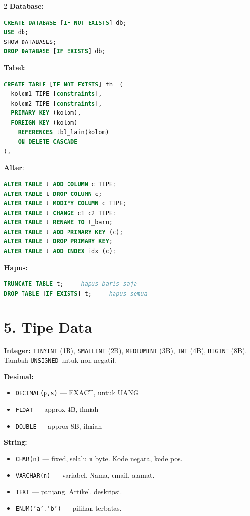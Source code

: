 \documentclass[10pt,a4paper]{article}
\begin{document}
\begin{multicols*}{2}
	\textbf{Database:}
	\begin{lstlisting}[language=SQL]
CREATE DATABASE [IF NOT EXISTS] db;
USE db;
SHOW DATABASES;
DROP DATABASE [IF EXISTS] db;
\end{lstlisting}

	\textbf{Tabel:}
	\begin{lstlisting}[language=SQL]
CREATE TABLE [IF NOT EXISTS] tbl (
  kolom1 TIPE [constraints],
  kolom2 TIPE [constraints],
  PRIMARY KEY (kolom),
  FOREIGN KEY (kolom)
    REFERENCES tbl_lain(kolom)
    ON DELETE CASCADE
);
\end{lstlisting}

	\textbf{Alter:}
	\begin{lstlisting}[language=SQL]
ALTER TABLE t ADD COLUMN c TIPE;
ALTER TABLE t DROP COLUMN c;
ALTER TABLE t MODIFY COLUMN c TIPE;
ALTER TABLE t CHANGE c1 c2 TIPE;
ALTER TABLE t RENAME TO t_baru;
ALTER TABLE t ADD PRIMARY KEY (c);
ALTER TABLE t DROP PRIMARY KEY;
ALTER TABLE t ADD INDEX idx (c);
\end{lstlisting}

	\textbf{Hapus:}
	\begin{lstlisting}[language=SQL]
TRUNCATE TABLE t;  -- hapus baris saja
DROP TABLE [IF EXISTS] t;  -- hapus semua
\end{lstlisting}

	\section*{5. Tipe Data}

	\textbf{Integer:} \texttt{TINYINT} (1B), \texttt{SMALLINT} (2B), \texttt{MEDIUMINT} (3B), \texttt{INT} (4B), \texttt{BIGINT} (8B). Tambah \texttt{UNSIGNED} untuk non-negatif.

	\textbf{Desimal:}
	\begin{itemize}
		\item \texttt{DECIMAL(p,s)} — EXACT, untuk UANG
		\item \texttt{FLOAT} — approx 4B, ilmiah
		\item \texttt{DOUBLE} — approx 8B, ilmiah
	\end{itemize}

	\textbf{String:}
	\begin{itemize}
		\item \texttt{CHAR(n)} — fixed, selalu n byte. Kode negara, kode pos.
		\item \texttt{VARCHAR(n)} — variabel. Nama, email, alamat.
		\item \texttt{TEXT} — panjang. Artikel, deskripsi.
		\item \texttt{ENUM('a','b')} — pilihan terbatas.
	\end{itemize}


\end{multicols*}
\end{document}
